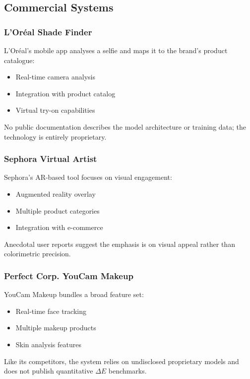 \subsection{Commercial Systems}

\subsubsection{L'Oréal Shade Finder}

L'Oréal's mobile app analyses a selfie and maps it to the brand's product catalogue:
\begin{itemize}
    \item Real-time camera analysis
    \item Integration with product catalog
    \item Virtual try-on capabilities
\end{itemize}

No public documentation describes the model architecture or training data; the technology is entirely proprietary.

\subsubsection{Sephora Virtual Artist}

Sephora's AR-based tool focuses on visual engagement:
\begin{itemize}
    \item Augmented reality overlay
    \item Multiple product categories
    \item Integration with e-commerce
\end{itemize}

Anecdotal user reports suggest the emphasis is on visual appeal rather than colorimetric precision.

\subsubsection{Perfect Corp. YouCam Makeup}

YouCam Makeup bundles a broad feature set:
\begin{itemize}
    \item Real-time face tracking
    \item Multiple makeup products
    \item Skin analysis features
\end{itemize}

Like its competitors, the system relies on undisclosed proprietary models and does not publish quantitative $\Delta E$ benchmarks.

